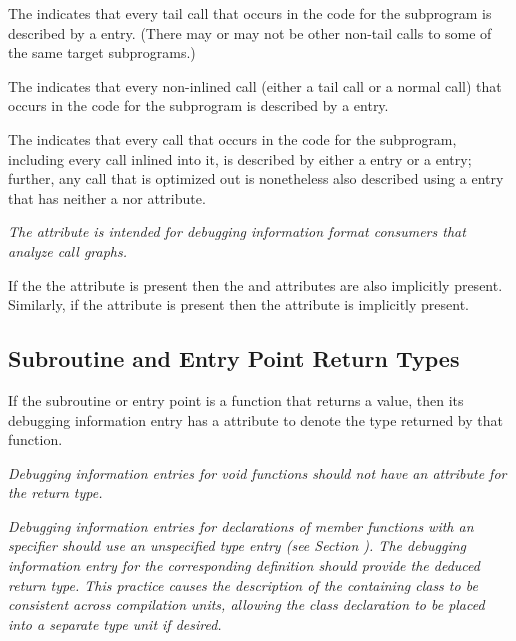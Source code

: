 The \DWATcallalltailcallsDEFN{}
indicates that every tail call 
that occurs in the code for the subprogram is described by a 
\DWTAGcallsite{} entry. 
(There may or may not be other non-tail calls to some of the same 
target subprograms.)

The \DWATcallallcallsDEFN{}
indicates that every non-inlined call
(either a tail call or a normal call) that occurs in the code for the subprogram
is described by a \DWTAGcallsite{} entry.

The \DWATcallallsourcecallsDEFN{}
indicates that every call that occurs in the
code for the subprogram, including every call inlined into it, is described by either a 
\DWTAGcallsite{} entry or a \DWTAGinlinedsubroutine{} entry; further, any call
that is optimized out is nonetheless also described using a \DWTAGcallsite{} entry 
that has neither a \DWATcallpc{} nor \DWATcallreturnpc{} attribute.

\textit{The \DWATcallallsourcecallsNAME{} attribute is intended for debugging 
information format consumers that analyze call graphs.}

If the the \DWATcallallsourcecalls{} attribute is present then the 
\DWATcallallcalls{} and \DWATcallalltailcalls{} attributes are 
also implicitly present. Similarly, if the 
\DWATcallallcalls{} attribute is present then the \DWATcallalltailcalls{} 
attribute is implicitly present.

\subsection{Subroutine and Entry Point Return Types}
\label{chap:subroutineandentrypointreturntypes}

If\hypertarget{chap:DWATtypetypeofsubroutinereturn}{}
the subroutine or entry point 
is a function that returns a
value, then its debugging information entry has 
a \DWATtypeDEFN{} attribute 
to denote the type returned by that function.

\textit{Debugging information entries for 
 void functions should
not have an attribute for the return type.  }

\textit{Debugging information entries for declarations of  
member functions with an 
\autoreturntype{} specifier should use an unspecified type entry (see 
Section ). 
The debugging information entry for the corresponding definition
should provide the deduced return type.  This practice causes the description of
the containing class to be consistent across compilation units, allowing the class
declaration to be placed into a separate type unit if desired.}


